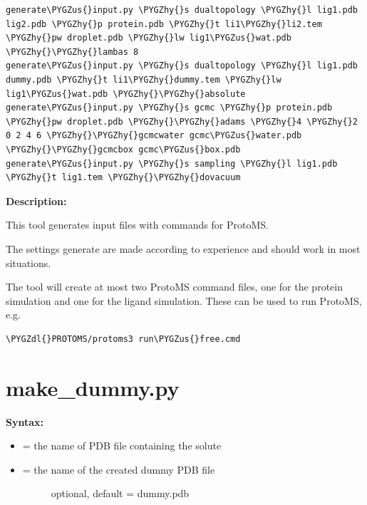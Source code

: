 \documentclass[letterpaper,10pt,english]{sphinxmanual}
\def\PYGZus{\char`\_}
\def\PYGZdl{\char`\$}
\def\PYGZhy{\char`\-}
\begin{document}
\begin{Verbatim}[commandchars=\\\{\}]
generate\PYGZus{}input.py \PYGZhy{}s dualtopology \PYGZhy{}l lig1.pdb lig2.pdb \PYGZhy{}p protein.pdb \PYGZhy{}t li1\PYGZhy{}li2.tem \PYGZhy{}pw droplet.pdb \PYGZhy{}lw lig1\PYGZus{}wat.pdb \PYGZhy{}\PYGZhy{}lambas 8
generate\PYGZus{}input.py \PYGZhy{}s dualtopology \PYGZhy{}l lig1.pdb dummy.pdb \PYGZhy{}t li1\PYGZhy{}dummy.tem \PYGZhy{}lw lig1\PYGZus{}wat.pdb \PYGZhy{}\PYGZhy{}absolute
generate\PYGZus{}input.py \PYGZhy{}s gcmc \PYGZhy{}p protein.pdb \PYGZhy{}pw droplet.pdb \PYGZhy{}\PYGZhy{}adams \PYGZhy{}4 \PYGZhy{}2 0 2 4 6 \PYGZhy{}\PYGZhy{}gcmcwater gcmc\PYGZus{}water.pdb \PYGZhy{}\PYGZhy{}gcmcbox gcmc\PYGZus{}box.pdb
generate\PYGZus{}input.py \PYGZhy{}s sampling \PYGZhy{}l lig1.pdb \PYGZhy{}t lig1.tem \PYGZhy{}\PYGZhy{}dovacuum
\end{Verbatim}

\textbf{Description:}

This tool generates input files with commands for ProtoMS.

The settings generate are made according to experience and should work in most situations.

The tool will create at most two ProtoMS command files, one for the protein simulation and one for the ligand simulation. These can be used to run ProtoMS, e.g.

\begin{Verbatim}[commandchars=\\\{\}]
\PYGZdl{}PROTOMS/protoms3 run\PYGZus{}free.cmd
\end{Verbatim}


\section{make\_dummy.py}
\label{tools:make-dummy-py}
\textbf{Syntax:}

\begin{itemize}
\item {} 
 = the name of PDB file containing the solute

\item {} \begin{description}
\item[{ = the name of the created dummy PDB file}] \leavevmode
optional, default = dummy.pdb

\end{description}

\end{itemize}
\end{document}
